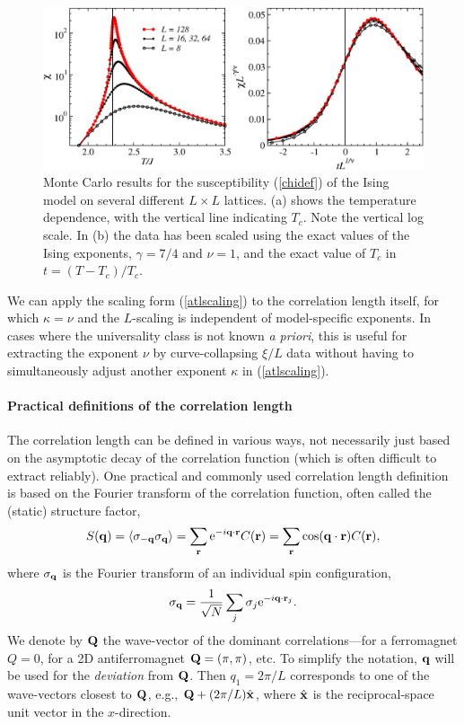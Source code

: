 \documentclass[draft,numberedheadings]{aipproc}
\begin{document}
\begin{figure}
\includegraphics[width=13cm, clip]{isingsusc.eps}
\caption{Monte Carlo results for the susceptibility (\ref{chidef}) of the Ising model on several different $L\times L$ lattices. (a) shows the temperature 
dependence, with the vertical line indicating $T_c$. Note the vertical log scale. In (b) the data has been scaled using the exact values of the Ising exponents,
$\gamma=7/4$ and $\nu=1$, and the exact value of $T_c$ in $t=(T-T_c)/T_c$.}
\label{isingsusc}
\end{figure}

We can apply the scaling form (\ref{atlscaling}) to the correlation length itself, for which $\kappa=\nu$ and the $L$-scaling is independent of 
model-specific exponents. In cases where the universality class is not known {\it a priori}, this is useful for extracting the exponent $\nu$ by curve-collapsing
$\xi/L$ data without having to simultaneously adjust another exponent $\kappa$ in (\ref{atlscaling}). 

\paragraph{Practical definitions of the correlation length}

The correlation length can be defined in various ways, not necessarily just based on the asymptotic decay of the correlation function (which is often 
difficult to extract reliably). One practical and commonly used correlation length definition is based on the Fourier transform of the correlation 
function, often called the (static) structure factor,
\begin{equation}
S({\bf q})=\langle \sigma_{\bf -q}\sigma_{\bf q}\rangle = \sum_{{\bf r}}{\rm e}^{-i{\bf q}\cdot {\bf r}}C({\bf r})
=\sum_{{\bf r}}\cos({\bf q}\cdot {\bf r})C({\bf r}),
\label{sqdefising}
\end{equation}
where $\sigma_{\bf q}$ is the Fourier transform of an individual spin configuration,
\begin{equation}
\sigma_{\bf q}=\frac{1}{\sqrt{N}}\sum_j \sigma_j {\rm e}^{-i{\bf q}\cdot {\bf r}_j}.
\label{sigmaqdefising}
\end{equation}
We denote by ${\bf Q}$ the wave-vector of the dominant correlations---for a ferromagnet $Q=0$, for a 2D antiferromagnet 
${\bf Q}=(\pi,\pi)$, etc. To simplify the notation, ${\bf q}$ will be used for the {\it deviation} from ${\bf Q}$. Then $q_1=2\pi/L$ corresponds 
to one of the wave-vectors closest to ${\bf Q}$, e.g., ${\bf Q} + (2\pi/L)\hat {\bf x}$, where $\hat {\bf x}$ is the reciprocal-space unit vector in 
the $x$-direction. 
\end{document}
